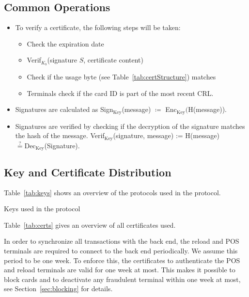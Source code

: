 \documentclass{article}
\begin{document}
\subsection{Common Operations}
\begin{itemize}
    \item To verify a certificate, the following steps will be taken:
        \begin{itemize}
            \item Check the expiration date
            \item Verif$_{K_b}$(signature $S$, certificate content)
            \item Check if the usage byte (see Table~\ref{tab:certStructure}) matches
            \item Terminals check if the card ID is part of the most recent CRL\@.
        \end{itemize}

    \item Signatures are calculated as Sign$_{\textrm{Key}}$(message) $\coloneqq$ \textrm{Enc}$_{\textrm{Key}}($H(message)).

    \item Signatures are verified by checking if the decryption of the signature matches the hash of the message.
    Verif$_{\textrm{Key}}$(signature, message) := H(message) $\stackrel{?}{=} \textrm{Dec}_{\textrm{Key}}$(Signature).
\end{itemize}

\subsection{Key and Certificate Distribution}

Table~\ref{tab:keys} shows an overview of the protocols used in the protocol.
\begin{table}[h]
    \centering
    
    \caption{Keys used in the protocol}
    \label{tab:keys}
\end{table}

Table~\ref{tab:certs} gives an overview of all certificates used.

In order to synchronize all transactions with the back end, the reload and POS terminals are required to connect to the back end periodically.
We assume this period to be one week.
To enforce this, the certificates to authenticate the POS and reload terminals are valid for one week at most.
This makes it possible to block cards and to deactivate any fraudulent terminal within one week at most, see Section~\ref{sec:blocking} for details.
\end{document}
